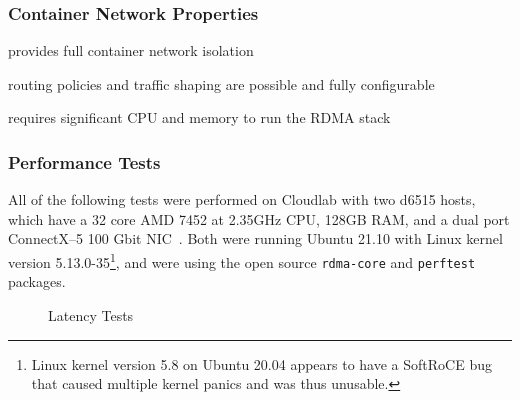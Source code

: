 \documentclass[12pt,titlepage]{article}
\begin{document}
\subsubsection*{Container Network Properties}
\begin{description}[nolistsep,font={{\scshape\bfseries}}]
	\item[Network Isolation] provides full container network isolation
	\item[Controllability] routing policies and traffic shaping are possible and fully configurable
	\item[Resource Utilization] requires significant CPU and memory to run the RDMA stack
\end{description}

\subsubsection*{Performance Tests}
All of the following tests were performed on Cloudlab with two d6515 hosts, which have a 32 core AMD 7452 at 2.35GHz CPU, 128GB RAM, and a dual port ConnectX--5 100 Gbit NIC~\cite{cloudlab}. 
Both were running Ubuntu 21.10 with Linux kernel version 5.13.0-35\footnote{Linux kernel version 5.8 on Ubuntu 20.04 appears to have a SoftRoCE bug that caused multiple kernel panics and was thus unusable.}, and were using the open source \texttt{rdma-core} and \texttt{perftest} packages.

\begin{figure}
	\centering
	\caption{Latency Tests}%
	\label{fig:softroce_latency}
\end{figure}
\end{document}

